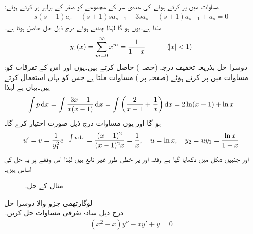 :مساوات  میں  پر کرتے  ہوئے  کی عددی سر کے مجموعے کو صفر کے برابر پر کرتے ہوئے
\begin{align*}
s(s-1)a_s-(s+1)sa_{s+1}+3sa_s-(s+1)a_{s+1}+a_s=0
\end{align*}
 ملتا ہے۔یوں  ہو گا لہٰذا  چنتے ہوئے درج ذیل حل حاصل ہوتا ہے۔
\begin{align*}
y_1(x)=\sum_{m=0}^{\infty} x^m=\frac{1}{1-x}\quad \quad \quad (\abs{x} <1)
\end{align*}
:دوسرا حل بذریعہ تخفیف درجہ (حصہ ) حاصل کرتے ہیں۔یوں  اور اس کے تفرقات کو مساوات میں پر کرتے ہوئے (صفحہ  پر ) مساوات  ملتا ہے جس  کو یہاں استعمال کرتے ہیں۔یہاں  ہے لہٰذا
\begin{align*}
\int p\dif x=\int \frac{3x-1}{x(x-1)}\dif x=\int \left(\frac{2}{x-1}+\frac{1}{x}\right)\dif x=2\ln(x-1)+\ln x
\end{align*}
ہو گا اور یوں مساوات  درج ذیل صورت اختیار کرے گا۔
 \begin{align*}
u'=v=\frac{1}{y_1^2}e^{-\int p \dif x}=\frac{(x-1)^2}{(x-1)^2x}=\frac{1}{x}, \quad u=\ln x, \quad y_2=uy_1=\frac{\ln x}{1-x}
\end{align*}
 اور  جنہیں شکل میں دکھایا گیا ہے وقفہ  اور  پر خطی طور غیر تابع ہیں لہٰذا اس وقفے پر یہ حل کی اساس ہیں۔
\begin{figure}
\centering
{}
\caption{مثال  کے حل۔}
\label{شکل_مثال_بیسل_دوسری_صورت_دوہرا_حل}
\end{figure} 
\quad لوگارتھمی جزو والا دوسرا حل\\
درج ذیل سادہ تفرقی مساوات حل کریں۔
\begin{align}\label{مساوات_بیسل_لوگارتھمی_جزو_الف}
(x^2-x)y''-xy'+y=0
\end{align}

